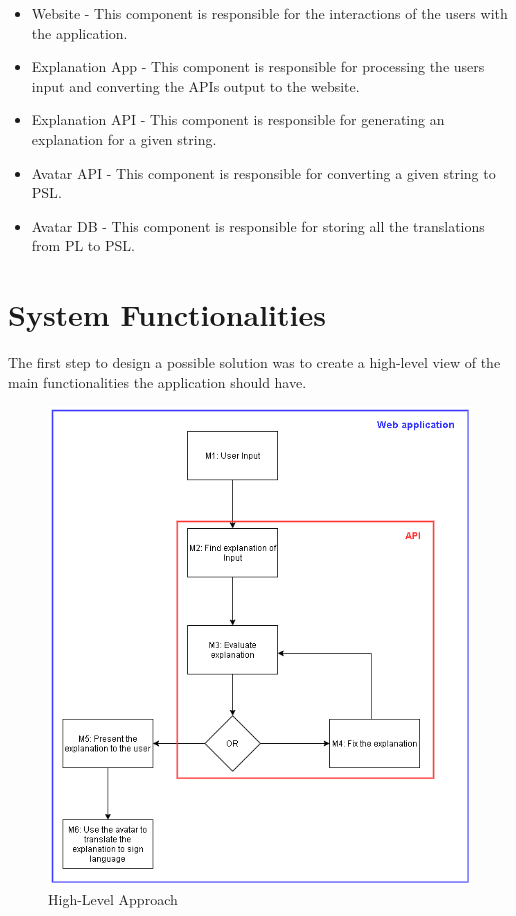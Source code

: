 \begin{itemize}
    \item Website - This component is responsible for the interactions of the users with the application.
    \item Explanation App - This component is responsible for processing the users input and converting the APIs output to the website.
    \item Explanation API - This component is responsible for generating an explanation for a given string.
    \item Avatar API - This component is responsible for converting a given string to \gls{PSL}.
    \item Avatar DB - This component is responsible for storing all the translations from \gls{PL} to \gls{PSL}.
\end{itemize}

\section{System Functionalities}

The first step to design a possible solution was to create a high-level view of the main functionalities the application should have.

\begin{figure}[H]
\centering
\includegraphics[scale=0.5]{ch4/assets/diagram1_2.png}
\caption[High-Level Approach]{High-Level Approach}
\label{fig:Diagram1}
\end{figure}

